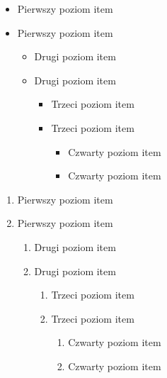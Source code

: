 \documentclass[a4paper,12pt]{article}
\begin{document}
	
	\begin{itemize}
		\item Pierwszy poziom item
		\item Pierwszy poziom item
		\begin{itemize}
			\item Drugi poziom item
			\item Drugi poziom item
			\begin{itemize}
				\item Trzeci poziom item
				\item Trzeci poziom item
				\begin{itemize}
					\item Czwarty poziom item
					\item Czwarty poziom item
				\end{itemize}
			\end{itemize}
		\end{itemize}
	\end{itemize}
	
	
	\begin{enumerate}
		\item Pierwszy poziom item
		\item Pierwszy poziom item
		\begin{enumerate}
			\item Drugi poziom item
			\item Drugi poziom item
			\begin{enumerate}
				\item Trzeci poziom item
				\item Trzeci poziom item
				\begin{enumerate}
					\item Czwarty poziom item
					\item Czwarty poziom item
				\end{enumerate}
			\end{enumerate}
		\end{enumerate}
	\end{enumerate}
	
\end{document}
